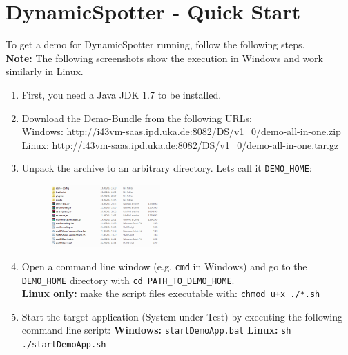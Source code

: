 \documentclass{report}
\newcommand{\DS}{DynamicSpotter }
\newcommand{\link}[1]{\textcolor[rgb]{0.0,0.0,1.0}{\href{#1}{#1}}}
\begin{document}
\newpage
\section{DynamicSpotter - Quick Start}
To get a demo for \DS running, follow the following steps.\\
\textbf{Note:} The following screenshots show the execution in Windows and work similarly in Linux.
\begin{enumerate}
  \item First, you need a Java JDK 1.7 to be installed.
  \item Download the Demo-Bundle from the following URLs:\\
  	\newline
	\newline
	Windows: \link{http://i43vm-saas.ipd.uka.de:8082/DS/v1\_0/demo-all-in-one.zip}
	\newline
	Linux: \link{http://i43vm-saas.ipd.uka.de:8082/DS/v1\_0/demo-all-in-one.tar.gz}
  \item Unpack the archive to an arbitrary directory. Lets call it \texttt{DEMO\_HOME}:
  		\begin{figure}[h!]
			\centering
			\includegraphics[width=0.4\textwidth]{figures/quickStart/SNAG-0000.png}
			\label{fig:unpackedArchive}
		\end{figure}
  \item Open a command line window (e.g. \texttt{cmd} in Windows) and go to the \texttt{DEMO\_HOME}
  directory with \texttt{cd PATH\_TO\_DEMO\_HOME}.\\
  \textbf{Linux only:} make the script files executable with:
  \texttt{chmod u+x ./*.sh}
  \item Start the target application (System under Test) by executing the following command line script:
    \newline
	\newline
	\textbf{Windows:} \texttt{startDemoApp.bat}
	\newline
	\textbf{Linux:} \texttt{sh ./startDemoApp.sh}


\end{enumerate}
\end{document}
